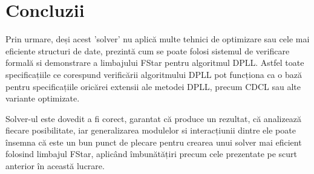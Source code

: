 \chapter*{Concluzii} 


Prin urmare, deși acest 'solver' nu aplică multe tehnici de optimizare sau cele mai eficiente structuri de date, prezintă cum se poate folosi sistemul de verificare formală si demonstrare a limbajului FStar pentru algoritmul DPLL. Astfel toate specificațiile ce corespund verificării algoritmului DPLL pot funcționa ca o bază pentru specificațiile oricărei extensii ale metodei DPLL, precum CDCL sau alte variante optimizate.

Solver-ul este dovedit a fi corect, garantat că produce un rezultat, că analizează fiecare posibilitate, iar generalizarea modulelor si interacțiunii dintre ele poate însemna că este un bun punct de plecare pentru crearea unui solver mai eficient folosind \newline limbajul FStar, aplicând îmbunătățiri precum cele prezentate pe scurt anterior în această lucrare. 

